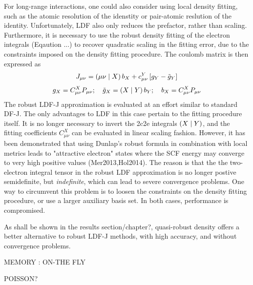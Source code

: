 For long-range interactions, one could also consider using local density fitting, such as the atomic resolution of the idenstity or pair-atomic reslution of the identity. Unfortunately, LDF also only reduces the prefactor, rather than scaling. Furthermore, it is necessary to use the robust density fitting of the electron integrals (Eqaution ...) to recover quadratic scaling in the fitting error, due to the constraints imposed on the density fitting procedure. The coulomb matrix is then expressed as
\begin{equation}
J_{\mu\nu} = \left( \mu\nu \mid X \right) b_X + c^Y_{\mu\nu} \left[ g_Y - \tilde{g}_Y \right]
\end{equation}
\begin{equation}
g_X = C^X_{\mu\nu} P_{\mu\nu}; \quad \tilde{g}_X = \left( X \mid Y \right) b_{Y}; \quad b_{X} = C_{\mu\nu}^{X} P_{\mu\nu} 
\end{equation}
\noindent The robust LDF-J approximation is evaluated at an effort similar to standard DF-J. The only advantages to LDF in this case pertain to the fitting procedure itself. It is no longer necessary to invert the 2c2e integrals $\left( X \mid Y \right)$, and the fitting coefficients $C_{\mu\nu}^{X}$ can be evaluated in linear scaling fashion. However, it has been demonstrated that using Dunlap's robust formula in combination with local metrics leads to "attractive electron" states where the SCF energy may converge to very high positive values (Mer2013,Hol2014). The reason is that the the two-electron integral tensor in the robust LDF approximation is no longer postive semidefinite, but \emph{indefinite}, which can lead to severe convergence problems. One way to circumvent this problem is to loosen the constraints on the density fitting procedure, or use a larger auxiliary basis set. In both cases, performance is compromised.  

As shall be shown in the results section/chapter?, quasi-robust density offers a better alternative to robust LDF-J methods, with high accuracy, and without convergence problems.  

MEMORY : ON-THE FLY

POISSON? 


